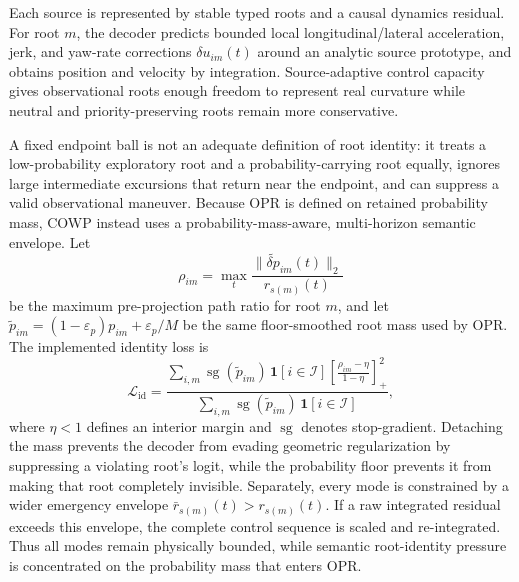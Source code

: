 \documentclass[10pt]{article}
\begin{document}
Each source is represented by stable typed roots and a causal dynamics residual. For root $m$, the decoder predicts bounded local longitudinal/lateral acceleration, jerk, and yaw-rate corrections $\delta u_{im}(t)$ around an analytic source prototype, and obtains position and velocity by integration. Source-adaptive control capacity gives observational roots enough freedom to represent real curvature while neutral and priority-preserving roots remain more conservative.

A fixed endpoint ball is not an adequate definition of root identity: it treats a low-probability exploratory root and a probability-carrying root equally, ignores large intermediate excursions that return near the endpoint, and can suppress a valid observational maneuver. Because OPR is defined on retained probability mass, COWP instead uses a probability-mass-aware, multi-horizon semantic envelope. Let
\begin{equation}
    \rho_{im}
    =
    \max_t
    \frac{\|\widetilde{\delta p}_{im}(t)\|_2}{r_{s(m)}(t)}
\end{equation}
be the maximum pre-projection path ratio for root $m$, and let $\widetilde p_{im}=(1-\varepsilon_p)p_{im}+\varepsilon_p/M$ be the same floor-smoothed root mass used by OPR. The implemented identity loss is
\begin{equation}
    \mathcal{L}_{\mathrm{id}}
    =
    \frac{
      \sum_{i,m}\operatorname{sg}(\widetilde p_{im})\,
      \mathbf{1}[i\in\mathcal I]
      \left[
        \frac{\rho_{im}-\eta}{1-\eta}
      \right]_+^2
    }{
      \sum_{i,m}\operatorname{sg}(\widetilde p_{im})\,
      \mathbf{1}[i\in\mathcal I]
    },
    \label{eq:natural_mass_envelope}
\end{equation}
where $\eta<1$ defines an interior margin and $\operatorname{sg}$ denotes stop-gradient. Detaching the mass prevents the decoder from evading geometric regularization by suppressing a violating root's logit, while the probability floor prevents it from making that root completely invisible. Separately, every mode is constrained by a wider emergency envelope $\bar r_{s(m)}(t)>r_{s(m)}(t)$. If a raw integrated residual exceeds this envelope, the complete control sequence is scaled and re-integrated. Thus all modes remain physically bounded, while semantic root-identity pressure is concentrated on the probability mass that enters OPR.
\end{document}
